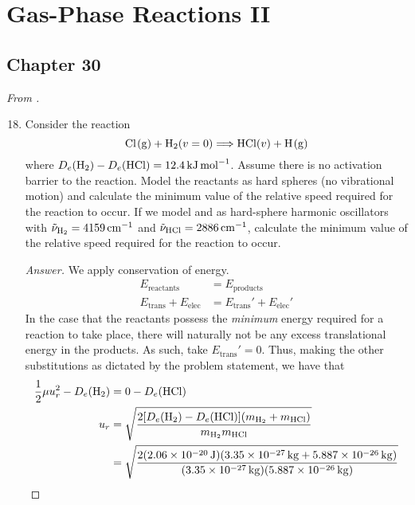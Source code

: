 \documentclass[../psets.tex]{subfiles}
\begin{document}
\section{Gas-Phase Reactions II}
\subsection*{Chapter 30}
\emph{From \textcite{bib:McQuarrieSimon}.}
\begin{enumerate}[label={\textbf{30-\arabic*.}},leftmargin=3.5em]
    \setcounter{enumi}{17}
    \item {}Consider the reaction
    \begin{equation*}
        \ce{Cl(g) + H2}(v=0) \Longrightarrow \ce{HCl($v$) + H(g)}
    \end{equation*}
    where $D_e(\ce{H2})-D_e(\ce{HCl})=\SI{12.4}{\kilo\joule\per\mole}$. Assume there is no activation barrier to the reaction. Model the reactants as hard spheres (no vibrational motion) and calculate the minimum value of the relative speed required for the reaction to occur. If we model  and  as hard-sphere harmonic oscillators with $\tilde{\nu}_{\ce{H2}}=\SI{4159}{\per\centi\meter}$ and $\tilde{\nu}_{\ce{HCl}}=\SI{2886}{\per\centi\meter}$, calculate the minimum value of the relative speed required for the reaction to occur.
    \begin{proof}[Answer]
        We apply conservation of energy.
        \begin{align*}
            E_\text{reactants} &= E_\text{products}\\
            E_\text{trans}+E_\text{elec} &= E_\text{trans}'+E_\text{elec}'
        \end{align*}
        In the case that the reactants possess the \emph{minimum} energy required for a reaction to take place, there will naturally not be any excess translational energy in the products. As such, take $E_\text{trans}'=0$. Thus, making the other substitutions as dictated by the problem statement, we have that
        \begin{align*}
            \frac{1}{2}\mu u_r^2-D_e(\ce{H2}) &= 0-D_e(\ce{HCl})\\
            u_r &= \sqrt{\frac{2[D_e(\ce{H2})-D_e(\ce{HCl})](m_{\ce{H2}}+m_{\ce{HCl}})}{m_{\ce{H2}}m_{\ce{HCl}}}}\\
            &= \sqrt{\frac{2(\SI{2.06e-20}{\joule})(\SI{3.35e-27}{\kilo\gram}+\SI{5.887e-26}{\kilo\gram})}{(\SI{3.35e-27}{\kilo\gram})(\SI{5.887e-26}{\kilo\gram})}}\\

\end{align*}
\end{proof}
\end{enumerate}
\end{document}
